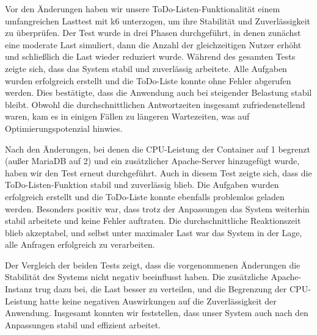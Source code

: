 Vor den Änderungen haben wir unsere ToDo-Listen-Funktionalität einem umfangreichen Lasttest mit k6 unterzogen, um ihre Stabilität und Zuverlässigkeit zu überprüfen. Der Test wurde in drei Phasen durchgeführt, in denen zunächst eine moderate Last simuliert, dann die Anzahl der gleichzeitigen Nutzer erhöht und schließlich die Last wieder reduziert wurde. Während des gesamten Tests zeigte sich, dass das System stabil und zuverlässig arbeitete. Alle Aufgaben wurden erfolgreich erstellt und die ToDo-Liste konnte ohne Fehler abgerufen werden. Dies bestätigte, dass die Anwendung auch bei steigender Belastung stabil bleibt. Obwohl die durchschnittlichen Antwortzeiten insgesamt zufriedenstellend waren, kam es in einigen Fällen zu längeren Wartezeiten, was auf Optimierungspotenzial hinwies.

Nach den Änderungen, bei denen die CPU-Leistung der Container auf 1 begrenzt (außer MariaDB auf 2) und ein zusätzlicher Apache-Server hinzugefügt wurde, haben wir den Test erneut durchgeführt. Auch in diesem Test zeigte sich, dass die ToDo-Listen-Funktion stabil und zuverlässig blieb. Die Aufgaben wurden erfolgreich erstellt und die ToDo-Liste konnte ebenfalls problemlos geladen werden. Besonders positiv war, dass trotz der Anpassungen das System weiterhin stabil arbeitete und keine Fehler auftraten. Die durchschnittliche Reaktionszeit blieb akzeptabel, und selbst unter maximaler Last war das System in der Lage, alle Anfragen erfolgreich zu verarbeiten.

Der Vergleich der beiden Tests zeigt, dass die vorgenommenen Änderungen die Stabilität des Systems nicht negativ beeinflusst haben. Die zusätzliche Apache-Instanz trug dazu bei, die Last besser zu verteilen, und die Begrenzung der CPU-Leistung hatte keine negativen Auswirkungen auf die Zuverlässigkeit der Anwendung. Insgesamt konnten wir feststellen, dass unser System auch nach den Anpassungen stabil und effizient arbeitet.


 
